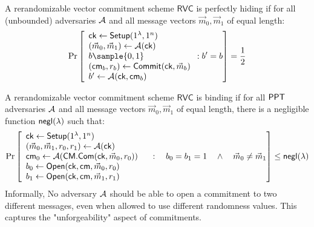 \begin{definition} A rerandomizable vector commitment scheme $\mathsf{RVC}$ is perfectly hiding if for all (unbounded) adversaries $\mathcal{A}$ and all message vectors $\vec{m}_0, \vec{m}_1$ of equal length:
\[
    \Pr
        \left [
            \begin{array}{l}
                \mathsf{ck} \gets \mathsf{Setup}(1^\lambda, 1^n) \\
                (\vec{m}_0, \vec{m}_1) \gets \mathcal{A}(\mathsf{ck}) \\
                b \sample \bit \\
                (\cm_b, r_b) \gets \mathsf{Commit}(\mathsf{ck}, \vec{m}_b) \\
                b' \gets \AdvA(\mathsf{ck}, \cm_b) \\
            \end{array}
            : b' = b
        \right ]
        = \frac{1}{2}
\]
\end{definition}


\begin{definition}[Binding] A rerandomizable vector commitment scheme $\mathsf{RVC}$ is binding if for all $\mathsf{PPT}$ adversaries $\mathcal{A}$ and all message vectors $\vec{m}_0, \vec{m}_1$ of equal length, there is a negligible function ${\mathsf{negl}(\lambda)}$ such that:
    \[
        \Pr
        \left [
            \begin{array}{l}
            \mathsf{ck} \gets \mathsf{Setup}(1^\lambda, 1^n) \\
            (\vec{m}_0, \vec{m}_1, r_0, r_1) \gets \mathcal{A}(\mathsf{ck}) \\
            \mathsf{cm}_0 \gets \mathcal{A}(\mathsf{CM.Com}(\mathsf{ck}, \vec{m}_0, r_0)) \\
            b_0 \gets \mathsf{Open}(\mathsf{ck}, \mathsf{cm}, \vec{m}_0, r_0) \\
            b_1 \gets \mathsf{Open}(\mathsf{ck}, \mathsf{cm}, \vec{m}_1, r_1) \\
            \end{array}
            \quad : \quad  b_0 = b_1 = 1 \quad \land \quad  \vec{m}_0 \neq  \vec{m}_1
        \right ] \leq {\mathsf{negl}(\lambda)}
    \]
Informally, No adversary $\mathcal{A}$ should be able to open a commitment to two different messages, even when allowed to use different randomness values. This captures the "unforgeability" aspect of commitments. 
\end{definition}


